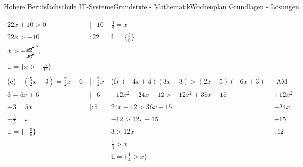 \documentclass[oneside,openany,headings=optiontotoc,11pt,numbers=noenddot]{scrreprt}
\begin{document}
\begin{worksheet}{Höhere Berufsfachschule IT-Systeme}{Grundstufe - Mathematik}{Wochenplan Grundlagen - Lösungen}
\begin{framed}
\begin{tabularx}{\textwidth}{XlXl}
				\(22x + 10 > 0\) & |\(-10\) & \(\frac{3}{8} = x\)\\
				\(22x > -10\) & \(:22\) & \(\mathbb{L} = \{\frac{3}{8}\}\)\\
				\(x > -\frac{\cancelto{5}{10}}{\cancelto{11}{22}}\)\\
				\(\mathbb{L} = \{x> -\frac{5}{11}\}\)\\
				\hline
				\hline
				\\
				(e) \(-(\frac{5}{2}x+3) = \frac{5}{2}x +6\) & |\(+\frac{5}{2}x\) & (f) \((-4x+4)(3x - 3) > (2x-5)(-6x +3)\) & | AM\\
				\(3 = 5x + 6\) & |\(-6\) & \(-12x^2 +24x - 12 > -12x^2 + 36x - 15\) & |\(+12x^2\)\\
				\(-3 = 5x\) & |\(:5\) & \(24x -12 > 36x -15\) & |\(-24x\)\\
				\(-\frac{3}{5} = x\) & & \(-12 > 12x - 15\) & |\(+15\)\\
				\(\mathbb{L} = \{-\frac{3}{5}\}\) & & \(3 > 12x\) & |\(:12\)\\
				& & \(\frac{1}{4} > x\)\\
				& & \(\mathbb{L} = \{\frac{1}{4} > x\}\)
				
			\end{tabularx}
		\end{framed}
	\end{worksheet}
\end{document}
